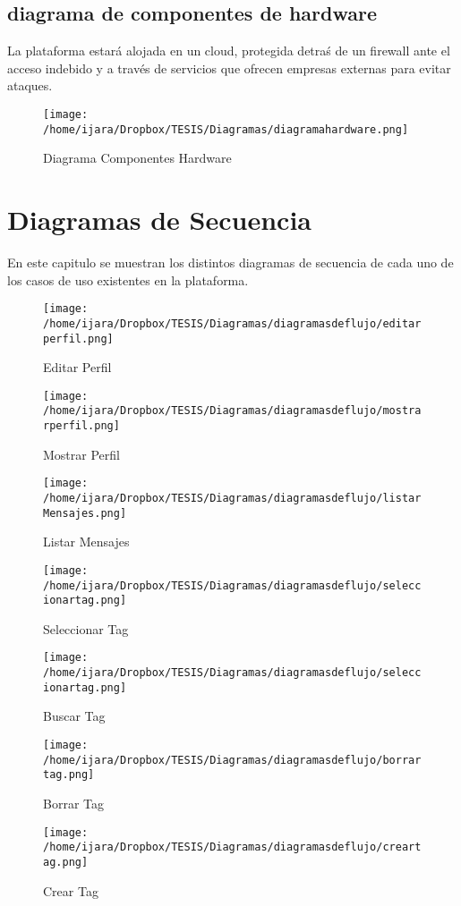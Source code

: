 \documentclass[letterpaper,openright,10pt,oneside]{report}
\begin{document}
\section{diagrama de componentes de hardware}
La plataforma estará alojada en un cloud, protegida detraś de un firewall ante el acceso indebido y a través de servicios que ofrecen empresas externas para evitar ataques.
\begin{figure}[htp]
\centering
\texttt{[image: /home/ijara/Dropbox/TESIS/Diagramas/diagramahardware.png]}
\caption{Diagrama Componentes Hardware}
\label{}
\end{figure}
\chapter{Diagramas de Secuencia}
En este capitulo se muestran los distintos diagramas de secuencia de cada uno de los casos de uso existentes en la plataforma.
\begin{figure}[htp]
\centering
\texttt{[image: /home/ijara/Dropbox/TESIS/Diagramas/diagramasdeflujo/editarperfil.png]}
\caption{Editar Perfil}
\label{}
\end{figure}
\begin{figure}[htp]
\centering
\texttt{[image: /home/ijara/Dropbox/TESIS/Diagramas/diagramasdeflujo/mostrarperfil.png]}
\caption{Mostrar Perfil}
\label{}
\end{figure}\begin{figure}[htp]
\centering
\texttt{[image: /home/ijara/Dropbox/TESIS/Diagramas/diagramasdeflujo/listarMensajes.png]}
\caption{Listar Mensajes}
\label{}
\end{figure}
\begin{figure}[htp]
\centering
\texttt{[image: /home/ijara/Dropbox/TESIS/Diagramas/diagramasdeflujo/seleccionartag.png]}
\caption{Seleccionar Tag}
\label{}
\end{figure}
\begin{figure}[htp]
\centering
\texttt{[image: /home/ijara/Dropbox/TESIS/Diagramas/diagramasdeflujo/seleccionartag.png]}
\caption{Buscar Tag}
\label{}
\end{figure}
\begin{figure}[htp]
\centering
\texttt{[image: /home/ijara/Dropbox/TESIS/Diagramas/diagramasdeflujo/borrartag.png]}
\caption{Borrar Tag}
\label{}
\end{figure}
\begin{figure}[htp]
\centering
\texttt{[image: /home/ijara/Dropbox/TESIS/Diagramas/diagramasdeflujo/creartag.png]}
\caption{Crear Tag}
\label{}
\end{figure}
\end{document}
